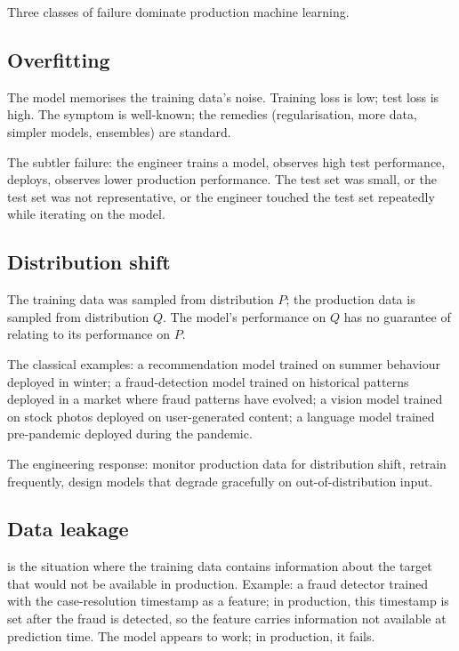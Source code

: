 Three classes of failure dominate production machine learning.

\subsection{Overfitting}

The model memorises the training data's noise. Training loss is low; test loss is high. The symptom is well-known; the remedies (regularisation, more data, simpler models, ensembles) are standard.

The subtler failure: the engineer trains a model, observes high test performance, deploys, observes lower production performance. The test set was small, or the test set was not representative, or the engineer touched the test set repeatedly while iterating on the model.

\subsection{Distribution shift}

The training data was sampled from distribution $P$; the production data is sampled from distribution $Q$. The model's performance on $Q$ has no guarantee of relating to its performance on $P$.

The classical examples: a recommendation model trained on summer behaviour deployed in winter; a fraud-detection model trained on historical patterns deployed in a market where fraud patterns have evolved; a vision model trained on stock photos deployed on user-generated content; a language model trained pre-pandemic deployed during the pandemic.

The engineering response: monitor production data for distribution shift, retrain frequently, design models that degrade gracefully on out-of-distribution input.

\subsection{Data leakage}

 is the situation where the training data contains information about the target that would not be available in production. Example: a fraud detector trained with the case-resolution timestamp as a feature; in production, this timestamp is set after the fraud is detected, so the feature carries information not available at prediction time. The model appears to work; in production, it fails.

